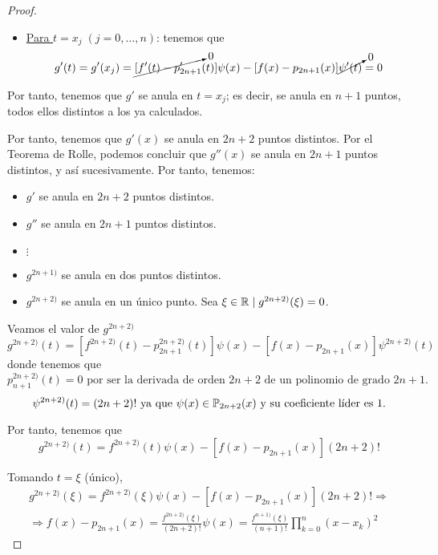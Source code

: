 \begin{proof}
    \begin{itemize}
        \item \underline{Para $t=x_j\;(j=0,\dots,n)$}: tenemos que $$g'(t)=g'(x_j)=\cancelto{0}{[f'(t)-p'_{2n+1}}(t)]\psi(x) - [f(x)-p_{2n+1}(x)]\cancelto{0}{\psi'(t)} = 0$$
    \end{itemize}
    Por tanto, tenemos que $g'$ se anula en $t=x_j$; es decir, se anula en $n+1$ puntos, todos ellos distintos a los ya calculados.

    Por tanto, tenemos que $g'(x)$ se anula en $2n+2$ puntos distintos. Por el Teorema de Rolle, podemos concluir que $g''(x)$ se anula en $2n+1$ puntos distintos, y así sucesivamente. Por tanto, tenemos:
    \begin{itemize}
        \item $g'$ se anula en $2n+2$ puntos distintos.
        \item $g''$ se anula en $2n+1$ puntos distintos.
        \item $\vdots$
        \item $g^{2n+1)}$ se anula en dos puntos distintos.
        \item $g^{2n+2)}$ se anula en un único punto. Sea $\xi \in \mathbb{R}\mid g^{2n+2)}(\xi) = 0$.
    \end{itemize}


    Veamos el valor de $g^{2n+2)}$
    \begin{equation*}
        g^{2n+2)}(t) = [f^{2n+2)}(t)-{p_{2n+1}^{2n+2)}}(t)]\psi(x) - [f(x)-p_{2n+1}(x)]\psi^{2n+2)}(t)
    \end{equation*}
    donde tenemos que 
    \begin{equation*}
        {p_{n+1}^{2n+2)}}(t) = 0\text{ por ser la derivada de orden $2n+2$ de un polinomio de grado $2n+1$.}
    \end{equation*}
    \begin{equation*}
        \psi^{2n+2)}(t) = (2n+2)!\text{ ya que $\psi (x) \in \mathbb{P}_{2n+2}(x)$ y su coeficiente líder es $1$.}
    \end{equation*}

    Por tanto, tenemos que
    \begin{equation*}
        g^{2n+2)}(t) = f^{2n+2)}(t)\psi(x) - [f(x)-p_{2n+1}(x)](2n+2)!
    \end{equation*}

    Tomando $t=\xi$ (único), 
    \begin{multline*}
        g^{2n+2)}(\xi) = f^{2n+2)}(\xi)\psi(x) - [f(x)-p_{2n+1}(x)](2n+2)!
        \Longrightarrow\\ \Longrightarrow
        f(x)-p_{2n+1}(x) = \frac{f^{2n+2)}(\xi)}{(2n+2)!}\psi(x) = \frac{f^{n+1)}(\xi)}{(n+1)!}\prod_{k=0}^n (x-x_k)^2
    \end{multline*}
\end{proof}

